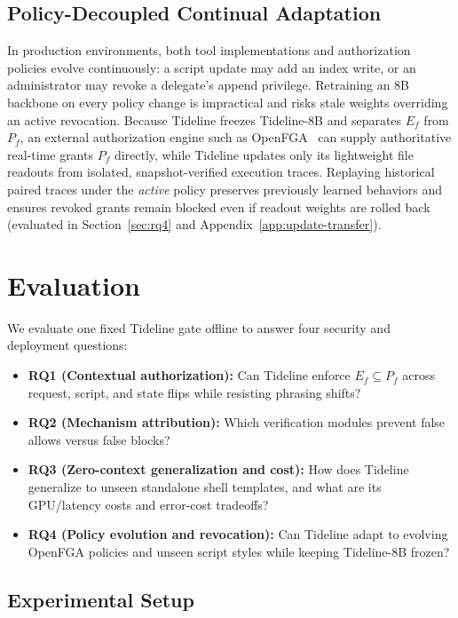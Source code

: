 \documentclass[sigconf,anonymous,nonacm]{acmart}
\begin{document}
\subsection{Policy-Decoupled Continual Adaptation}\label{sec:continual-design}
In production environments, both tool implementations and authorization policies evolve continuously: a script update may add an index write, or an administrator may revoke a delegate's append privilege. Retraining an 8B backbone on every policy change is impractical and risks stale weights overriding an active revocation. Because Tideline freezes Tideline-8B and separates $E_f$ from $P_f$, an external authorization engine such as OpenFGA~\cite{openfgastores} can supply authoritative real-time grants $P_f$ directly, while Tideline updates only its lightweight file readouts from isolated, snapshot-verified execution traces. Replaying historical paired traces under the \emph{active} policy preserves previously learned behaviors and ensures revoked grants remain blocked even if readout weights are rolled back (evaluated in Section~\ref{sec:rq4} and Appendix~\ref{app:update-transfer}).

\section{Evaluation}\label{sec:eval}
We evaluate one fixed Tideline gate offline to answer four security and deployment questions:
\begin{itemize}
    \item \textbf{RQ1 (Contextual authorization):} Can Tideline enforce $E_f \subseteq P_f$ across request, script, and state flips while resisting phrasing shifts?
    \item \textbf{RQ2 (Mechanism attribution):} Which verification modules prevent false allows versus false blocks?
    \item \textbf{RQ3 (Zero-context generalization and cost):} How does Tideline generalize to unseen standalone shell templates, and what are its GPU/latency costs and error-cost tradeoffs?
    \item \textbf{RQ4 (Policy evolution and revocation):} Can Tideline adapt to evolving OpenFGA policies and unseen script styles while keeping Tideline-8B frozen?
\end{itemize}

\subsection{Experimental Setup}\label{sec:external}
\end{document}

